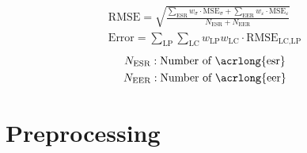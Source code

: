 \begin{gather}
    \label{eq: rmse}
        \text{RMSE} = \sqrt{\frac{\displaystyle\sum_{\text{ESR}} w_{\sigma} \cdot \text{MSE}_{\sigma} + \displaystyle\sum_{\text{EER}} w_{\varepsilon} \cdot \text{MSE}_{\varepsilon}}{N_\text{ESR} + N_\text{EER}}} \\
        \label{eq: error}
    \text{Error} = \sum_{\text{LP}} \sum_{\text{LC}} w_{\scriptscriptstyle\text{LP}} w_{\scriptscriptstyle\text{LC}} \cdot \text{RMSE}_{\scriptscriptstyle \text{LC}, \text{LP}}
\end{gather}
\begin{gather*}
        N_\text{ESR}: \text{Number of \acrlong{esr}} \\
    N_\text{EER}: \text{Number of \acrlong{eer}}
\end{gather*}




\section{Preprocessing} \label{sec: preprocessing}


